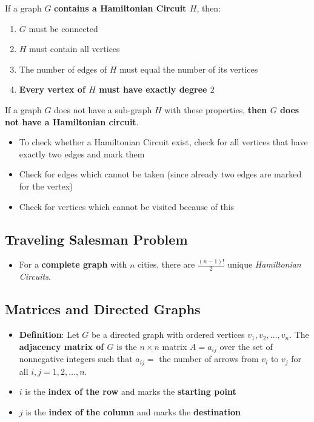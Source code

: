 If a graph $G$ \textbf{contains a Hamiltonian Circuit $H$}, then:
\begin{enumerate}
  \item $G$ must be connected
  \item $H$ must contain all vertices
  \item The number of edges of $H$ must equal the number of its vertices
  \item \textbf{Every vertex of $H$ must have exactly degree $2$}
\end{enumerate}

If a graph $G$ does not have a sub-graph $H$ with these properties, \textbf{then $G$ does not have a Hamiltonian circuit}.

\begin{itemize}
  \item To check whether a Hamiltonian Circuit exist, check for all vertices that have exactly two edges and mark them
  \item Check for edges which cannot be taken (since already two edges are marked for the vertex)
  \item Check for vertices which cannot be visited because of this
\end{itemize}

\subsection{Traveling Salesman Problem}
\begin{itemize}
  \item For a \textbf{complete graph} with $n$ cities, there are $\frac{(n-1)!}{2}$ unique \textit{Hamiltonian Circuits}.
\end{itemize}

\subsection{Matrices and Directed Graphs}
\begin{itemize}
  \item \textbf{Definition}: Let $G$ be a directed graph with ordered vertices $v_{1}, v_{2}, \dots, v_{n}$. The \textbf{adjacency matrix of $G$} is the $n \times n$ matrix $A = a_{ij}$ over the set of nonnegative integers such that $a_{ij} =$ the number of arrows from $v_{i}$ to $v_{j}$ for all $i, j = 1, 2, \dots, n$.
  \item $i$ is the \textbf{index of the row} and marks the \textbf{starting point}
  \item $j$ is the \textbf{index of the column} and marks the \textbf{destination}
\end{itemize}

